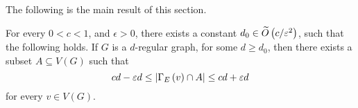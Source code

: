 \documentclass[11pt]{article}
\begin{document}

The following is the main result of this section.

\begin{lemma} \label{thm:partition}
For every $0 < c < 1$, and $\epsilon > 0$, there exists a constant $d_0 \in \widetilde{O}\left(c/\varepsilon^2\right)$, such that the following holds. If $G$ is a $d$-regular graph, for some $d \ge d_0$, then there exists a subset $A \subseteq V(G)$ such that
$$
    cd - \varepsilon d \leq \left| \Gamma_{E}\left(v\right) \cap A \right| \leq cd + \varepsilon d 
$$
for every $v \in V(G)$.
\end{lemma}
\end{document}

